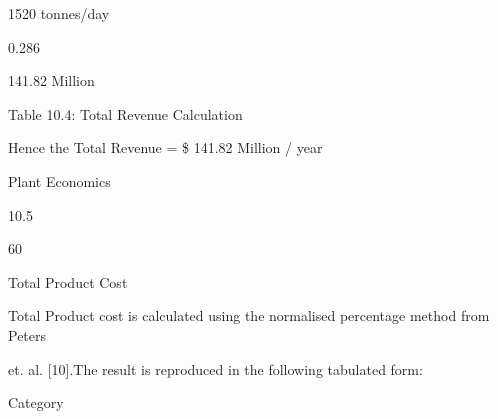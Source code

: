 \documentclass[a4paper,portrait,12pt]{article}
\begin{document}
\begin{flushleft}
1520 tonnes/day
\end{flushleft}





0.286





\begin{flushleft}
141.82 Million
\end{flushleft}





\begin{flushleft}
Table 10.4: Total Revenue Calculation
\end{flushleft}





\begin{flushleft}
Hence the Total Revenue = \$ 141.82 Million / year
\end{flushleft}





\begin{flushleft}
\newpage
Plant Economics
\end{flushleft}





10.5





60





\begin{flushleft}
Total Product Cost
\end{flushleft}





\begin{flushleft}
Total Product cost is calculated using the normalised percentage method from Peters
\end{flushleft}


\begin{flushleft}
et. al. [10].The result is reproduced in the following tabulated form:
\end{flushleft}


\begin{flushleft}
Category
\end{flushleft}
\end{document}
